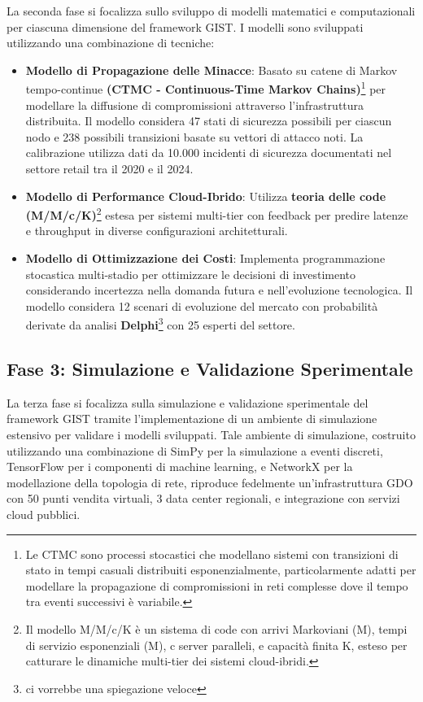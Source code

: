 La seconda fase si focalizza sullo sviluppo di modelli matematici e computazionali per ciascuna dimensione del framework GIST. I modelli sono sviluppati utilizzando una combinazione di tecniche:
\begin{itemize}
    \item \textbf{Modello di Propagazione delle Minacce}: Basato su catene di Markov tempo-continue \textbf{(CTMC - Continuous-Time Markov Chains)}\footnote{Le CTMC sono processi stocastici che modellano sistemi con transizioni di stato in tempi casuali distribuiti esponenzialmente, particolarmente adatti per modellare la propagazione di compromissioni in reti complesse dove il tempo tra eventi successivi è variabile.} per modellare la diffusione di compromissioni attraverso l'infrastruttura distribuita. Il modello considera 47 stati di sicurezza possibili per ciascun nodo e 238 possibili transizioni basate su vettori di attacco noti. La calibrazione utilizza dati da 10.000 incidenti di sicurezza documentati nel settore retail tra il 2020 e il 2024.
\item \textbf{Modello di Performance Cloud-Ibrido}: Utilizza \textbf{teoria delle code (M/M/c/K)}\footnote{Il modello M/M/c/K è un sistema di code con arrivi Markoviani (M), tempi di servizio esponenziali (M), c server paralleli, e capacità finita K, esteso per catturare le dinamiche multi-tier dei sistemi cloud-ibridi.} estesa per sistemi multi-tier con feedback per predire latenze e throughput in diverse configurazioni architetturali. 
\item \textbf{Modello di Ottimizzazione dei Costi}: Implementa programmazione stocastica multi-stadio per ottimizzare le decisioni di investimento considerando incertezza nella domanda futura e nell'evoluzione tecnologica. Il modello considera 12 scenari di evoluzione del mercato con probabilità derivate da analisi \textbf{Delphi}\footnote{ci vorrebbe una spiegazione veloce} con 25 esperti del settore.

\end{itemize}

\subsection{Fase 3: Simulazione e Validazione Sperimentale}

La terza fase si focalizza sulla simulazione e validazione sperimentale del framework GIST tramite l'implementazione di un ambiente di simulazione estensivo per validare i modelli sviluppati. Tale ambiente di simulazione, costruito utilizzando una combinazione di SimPy per la simulazione a eventi discreti, TensorFlow per i componenti di machine learning, e NetworkX per la modellazione della topologia di rete, riproduce fedelmente un'infrastruttura GDO con 50 punti vendita virtuali, 3 data center regionali, e integrazione con servizi cloud pubblici.

